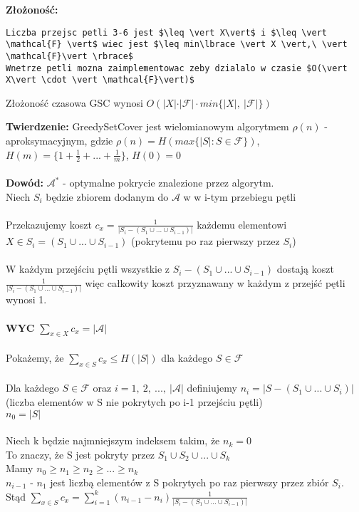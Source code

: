 \textbf{Złożoność: }
\begin{lstlisting}
Liczba przejsc petli 3-6 jest $\leq \vert X\vert$ i $\leq \vert \mathcal{F} \vert$ wiec jest $\leq min\lbrace \vert X \vert,\ \vert \mathcal{F}\vert \rbrace$
Wnetrze petli mozna zaimplementowac zeby dzialalo w czasie $O(\vert X\vert \cdot \vert \mathcal{F}\vert)$
\end{lstlisting}
\begin{center}
Złożoność czasowa GSC wynosi $O(\vert X\vert \cdot \vert\mathcal{F}\vert \cdot min\lbrace \vert X \vert,\ \vert \mathcal{F}\vert \rbrace)$
\end{center}
\textbf{Twierdzenie: }GreedySetCover jest wielomianowym algorytmem $\rho(n)$ - aproksymacyjnym, gdzie $\rho(n) = H(max\lbrace\vert S\vert :S\in \mathcal{F}\rbrace)$, $H(m) = \lbrace 1 + \frac{1}{2} + ... +\frac{1}{m}\rbrace$, $H(0)=0$\\
\\
\textbf{Dowód: }$\mathcal{A}^{\ast}$ - optymalne pokrycie znalezione przez algorytm.\\
\tab Niech $S_i$ będzie zbiorem dodanym do $\mathcal{A}$ w w i-tym przebiegu pętli\\\\
Przekazujemy koszt $c_x=\frac{1}{\vert S_i-(S_1\cup ... \cup S_{i-1})\vert}$ każdemu elementowi $X\in S_i = (S_1 \cup ... \cup S_{i-1})$ (pokrytemu po raz pierwszy przez $S_i$)\\
\\
\tab W każdym przejściu pętli wszystkie z $S_i - (S_1 \cup ... \cup S_{i-1})$ dostają koszt $\frac{1}{\vert S_i-(S_1\cup ... \cup S_{i-1})\vert}$ więc całkowity koszt przyznawany w każdym z przejść pętli wynosi 1.\\\\
\textbf{WYC} $\sum_{x\in X}c_x=\vert \mathcal{A}\vert$\\
\\
Pokażemy, że $\sum_{x\in S}c_x \leq H(\vert S\vert)$ dla każdego $S\in \mathcal{F}$\\
\\
Dla każdego $S\in \mathcal{F}$ oraz $i=1,\ 2,\ ...,\ \vert\mathcal{A}\vert$ definiujemy $n_i = \vert S - (S_1 \cup ... \cup S_i)\vert$ (liczba elementów w S nie pokrytych po i-1 przejściu pętli)\\
\tab $n_0=\vert S\vert$\\
\\
Niech k będzie najmniejszym indeksem takim, że $n_k=0$\\
\tab To znaczy, że S jest pokryty przez $S_1 \cup S_2 \cup ... \cup S_k$\\
Mamy $n_0\geq n_1\geq n_2\geq ...\geq n_k$\\
\tab $n_{i-1}$ - $n_1$ jest liczbą elementów z S pokrytych po raz pierwszy przez zbiór $S_i$.\\
Stąd $\sum_{x\in S}c_x = \sum_{i=1}^{k}(n_{i-1}-n_i)\frac{1}{\vert S_i - (S_1 \cup ... \cup S_{i-1})\vert}$

